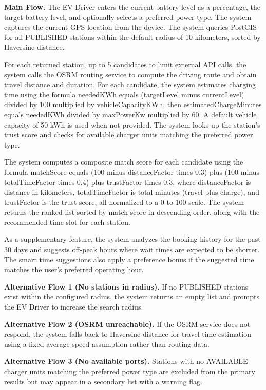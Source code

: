 \documentclass[../Main.tex]{subfiles}
\begin{document}
\textbf{Main Flow.} The EV Driver enters the current battery level as a percentage, the target battery level, and optionally selects a preferred power type. The system captures the current GPS location from the device. The system queries PostGIS for all PUBLISHED stations within the default radius of 10 kilometers, sorted by Haversine distance.

For each returned station, up to 5 candidates to limit external API calls, the system calls the OSRM routing service to compute the driving route and obtain travel distance and duration. For each candidate, the system estimates charging time using the formula neededKWh equals (targetLevel minus currentLevel) divided by 100 multiplied by vehicleCapacityKWh, then estimatedChargeMinutes equals neededKWh divided by maxPowerKw multiplied by 60. A default vehicle capacity of 50 kWh is used when not provided. The system looks up the station's trust score and checks for available charger units matching the preferred power type.

The system computes a composite match score for each candidate using the formula matchScore equals (100 minus distanceFactor times 0.3) plus (100 minus totalTimeFactor times 0.4) plus trustFactor times 0.3, where distanceFactor is distance in kilometers, totalTimeFactor is total minutes (travel plus charge), and trustFactor is the trust score, all normalized to a 0-to-100 scale. The system returns the ranked list sorted by match score in descending order, along with the recommended time slot for each station.

As a supplementary feature, the system analyzes the booking history for the past 30 days and suggests off-peak hours where wait times are expected to be shorter. The smart time suggestions also apply a preference bonus if the suggested time matches the user's preferred operating hour.

\textbf{Alternative Flow 1 (No stations in radius).} If no PUBLISHED stations exist within the configured radius, the system returns an empty list and prompts the EV Driver to increase the search radius.

\textbf{Alternative Flow 2 (OSRM unreachable).} If the OSRM service does not respond, the system falls back to Haversine distance for travel time estimation using a fixed average speed assumption rather than routing data.

\textbf{Alternative Flow 3 (No available ports).} Stations with no AVAILABLE charger units matching the preferred power type are excluded from the primary results but may appear in a secondary list with a warning flag.
\end{document}
